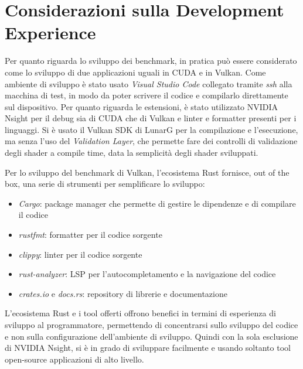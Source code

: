 \section{Considerazioni sulla Development Experience}


Per quanto riguarda lo sviluppo dei benchmark, in pratica può essere considerato come lo sviluppo di due applicazioni uguali in CUDA e in Vulkan. Come ambiente di sviluppo è stato usato \textit{Visual Studio Code} collegato tramite \textit{ssh} alla macchina di test, in modo da poter scrivere il codice e compilarlo direttamente sul dispositivo. Per quanto riguarda le estensioni, è stato utilizzato NVIDIA Nsight \cite[]{NVIDIA:nsight} per il debug sia di CUDA che di Vulkan e linter e formatter presenti per i linguaggi. Si è usato il Vulkan SDK di LunarG \cite[]{KG:vulkan_sdk} per la compilazione e l'esecuzione, ma senza l'uso del \textit{Validation Layer}, che permette fare dei controlli di validazione degli shader a compile time, data la semplicità degli shader sviluppati.


Per lo sviluppo del benchmark di Vulkan, l'ecosistema Rust fornisce, out of the box, una serie di strumenti per semplificare lo sviluppo:

\begin{itemize}
    \item \textit{Cargo}: package manager che permette di gestire le dipendenze e di compilare il codice
    \item \textit{rustfmt}: formatter per il codice sorgente
    \item \textit{clippy}: linter per il codice sorgente
    \item \textit{rust-analyzer}: \gls{LSP} per l'autocompletamento e la navigazione del codice
    \item \textit{crates.io} e \textit{docs.rs}: repository di librerie e documentazione
\end{itemize}

L'ecosistema Rust e i tool offerti offrono benefici in termini di esperienza di sviluppo al programmatore, permettendo di concentrarsi sullo sviluppo del codice e non sulla configurazione dell'ambiente di sviluppo. Quindi con la sola esclusione di NVIDIA Nsight, si è in grado di sviluppare facilmente e usando soltanto tool open-source applicazioni di alto livello.

